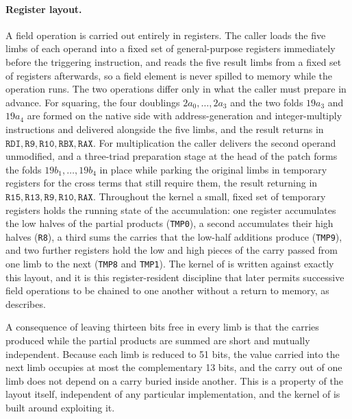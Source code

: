 \paragraph{Register layout.}
A field operation is carried out entirely in registers. The caller loads the five
limbs of each operand into a fixed set of general-purpose registers immediately
before the triggering instruction, and reads the five result limbs from a fixed set
of registers afterwards, so a field element is never spilled to memory while the
operation runs. The two operations differ only in what the caller must prepare in
advance. For squaring, the four doublings $2a_0,\dots,2a_3$ and the two folds
$19a_3$ and $19a_4$ are formed on the native side with address-generation and
integer-multiply instructions and delivered alongside the five limbs, and the result
returns in $\texttt{RDI},\texttt{R9},\texttt{R10},\texttt{RBX},\texttt{RAX}$. For
multiplication the caller delivers the second operand unmodified, and a three-triad
preparation stage at the head of the patch forms the folds $19b_1,\dots,19b_4$ in
place while parking the original limbs in temporary registers for the cross terms
that still require them, the result returning in
$\texttt{R15},\texttt{R13},\texttt{R9},\texttt{R10},\texttt{RAX}$. Throughout the
kernel a small, fixed set of temporary registers holds the running state of the
accumulation: one register accumulates the low halves of the partial products
(\texttt{TMP0}), a second accumulates their high halves (\texttt{R8}), a third sums
the carries that the low-half additions produce (\texttt{TMP9}), and two further
registers hold the low and high pieces of the carry passed from one limb to the next
(\texttt{TMP8} and \texttt{TMP1}). The kernel of  is written
against exactly this layout, and it is this register-resident discipline that later
permits successive field operations to be chained to one another without a return to
memory, as  describes.

A consequence of leaving thirteen bits free in every limb is that the carries
produced while the partial products are summed are short and mutually independent.
Because each limb is reduced to 51 bits, the value carried into the next limb
occupies at most the complementary 13 bits, and the carry out of one limb does not
depend on a carry buried inside another. This is a property of the layout itself,
independent of any particular implementation, and the kernel of
 is built around exploiting it.

